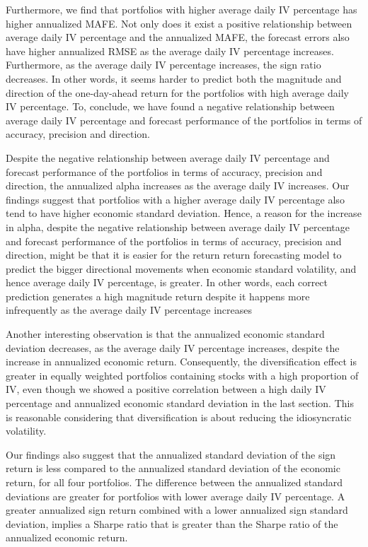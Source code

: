 Furthermore, we find that portfolios with higher average daily IV percentage has higher annualized MAFE. Not only does it exist a positive relationship between average daily IV percentage and the annualized MAFE, the forecast errors also have higher annualized RMSE as the average daily IV percentage increases. Furthermore, as the average daily IV percentage increases, the sign ratio decreases. In other words, it seems harder to predict both the magnitude and direction of the one-day-ahead return for the portfolios with high average daily IV percentage. To, conclude, we have found a negative relationship between average daily IV percentage and forecast performance of the portfolios in terms of accuracy, precision and direction. 

Despite the negative relationship between average daily IV percentage and forecast performance of the portfolios in terms of accuracy, precision and direction, the annualized alpha increases as the average daily IV increases. Our findings suggest that portfolios with a higher average daily IV percentage also tend to have higher economic standard deviation. Hence, a reason for the increase in alpha, despite the negative relationship between average daily IV percentage and forecast performance of the portfolios in terms of accuracy, precision and direction, might be that it is easier for the return return forecasting model to predict the bigger directional movements when economic standard volatility, and hence average daily IV percentage, is greater. In other words, each correct prediction generates a high magnitude return despite it happens more infrequently as the average daily IV percentage increases

Another interesting observation is that the annualized economic standard deviation decreases, as the average daily IV percentage increases, despite the increase in annualized economic return. Consequently, the diversification effect is greater in equally weighted portfolios containing stocks with a high proportion of IV, even though we showed a positive correlation between a high daily IV percentage and annualized economic standard deviation in the last section. This is reasonable considering that diversification is about reducing the idiosyncratic volatility.

Our findings also suggest that the annualized standard deviation of the sign return is less compared to the annualized standard deviation of the economic return, for all four portfolios. The difference between the annualized standard deviations are greater for portfolios with lower average daily IV percentage. A greater annualized sign return combined with a lower annualized sign standard deviation, implies a Sharpe ratio that is greater than the Sharpe ratio of the annualized economic return. 

